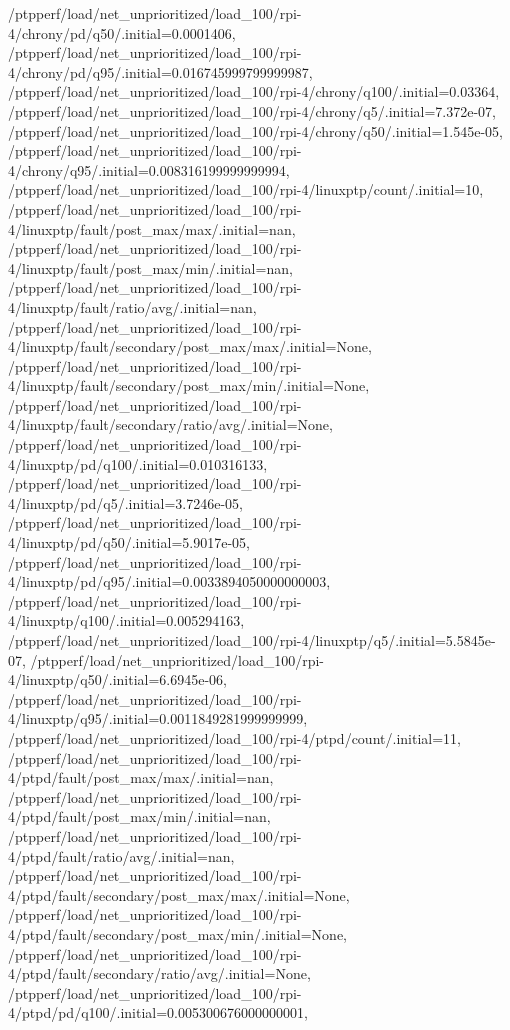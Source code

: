 {    /ptpperf/load/net_unprioritized/load_100/rpi-4/chrony/pd/q50/.initial=0.0001406,
    /ptpperf/load/net_unprioritized/load_100/rpi-4/chrony/pd/q95/.initial=0.016745999799999987,
    /ptpperf/load/net_unprioritized/load_100/rpi-4/chrony/q100/.initial=0.03364,
    /ptpperf/load/net_unprioritized/load_100/rpi-4/chrony/q5/.initial=7.372e-07,
    /ptpperf/load/net_unprioritized/load_100/rpi-4/chrony/q50/.initial=1.545e-05,
    /ptpperf/load/net_unprioritized/load_100/rpi-4/chrony/q95/.initial=0.008316199999999994,
    /ptpperf/load/net_unprioritized/load_100/rpi-4/linuxptp/count/.initial=10,
    /ptpperf/load/net_unprioritized/load_100/rpi-4/linuxptp/fault/post_max/max/.initial=nan,
    /ptpperf/load/net_unprioritized/load_100/rpi-4/linuxptp/fault/post_max/min/.initial=nan,
    /ptpperf/load/net_unprioritized/load_100/rpi-4/linuxptp/fault/ratio/avg/.initial=nan,
    /ptpperf/load/net_unprioritized/load_100/rpi-4/linuxptp/fault/secondary/post_max/max/.initial=None,
    /ptpperf/load/net_unprioritized/load_100/rpi-4/linuxptp/fault/secondary/post_max/min/.initial=None,
    /ptpperf/load/net_unprioritized/load_100/rpi-4/linuxptp/fault/secondary/ratio/avg/.initial=None,
    /ptpperf/load/net_unprioritized/load_100/rpi-4/linuxptp/pd/q100/.initial=0.010316133,
    /ptpperf/load/net_unprioritized/load_100/rpi-4/linuxptp/pd/q5/.initial=3.7246e-05,
    /ptpperf/load/net_unprioritized/load_100/rpi-4/linuxptp/pd/q50/.initial=5.9017e-05,
    /ptpperf/load/net_unprioritized/load_100/rpi-4/linuxptp/pd/q95/.initial=0.0033894050000000003,
    /ptpperf/load/net_unprioritized/load_100/rpi-4/linuxptp/q100/.initial=0.005294163,
    /ptpperf/load/net_unprioritized/load_100/rpi-4/linuxptp/q5/.initial=5.5845e-07,
    /ptpperf/load/net_unprioritized/load_100/rpi-4/linuxptp/q50/.initial=6.6945e-06,
    /ptpperf/load/net_unprioritized/load_100/rpi-4/linuxptp/q95/.initial=0.0011849281999999999,
    /ptpperf/load/net_unprioritized/load_100/rpi-4/ptpd/count/.initial=11,
    /ptpperf/load/net_unprioritized/load_100/rpi-4/ptpd/fault/post_max/max/.initial=nan,
    /ptpperf/load/net_unprioritized/load_100/rpi-4/ptpd/fault/post_max/min/.initial=nan,
    /ptpperf/load/net_unprioritized/load_100/rpi-4/ptpd/fault/ratio/avg/.initial=nan,
    /ptpperf/load/net_unprioritized/load_100/rpi-4/ptpd/fault/secondary/post_max/max/.initial=None,
    /ptpperf/load/net_unprioritized/load_100/rpi-4/ptpd/fault/secondary/post_max/min/.initial=None,
    /ptpperf/load/net_unprioritized/load_100/rpi-4/ptpd/fault/secondary/ratio/avg/.initial=None,
    /ptpperf/load/net_unprioritized/load_100/rpi-4/ptpd/pd/q100/.initial=0.005300676000000001,
}
